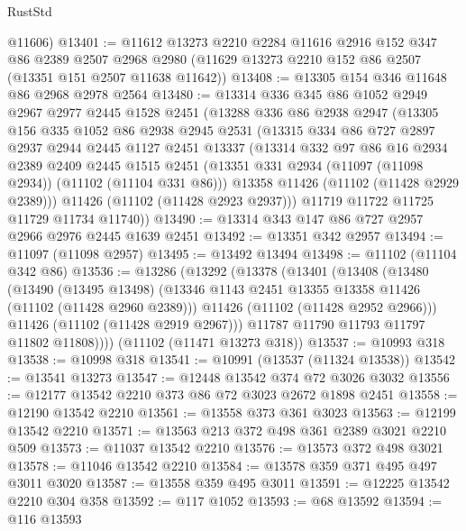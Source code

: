 \begin{lexlean}{RustStd}
\begin{coremodule}
      @11606)
@13401 := @11612
    @13273
    @2210
    @2284
    @11616
    @2916
    @152
    @347
    @86
    @2389
    @2507
    @2968
    @2980
    (@11629 @13273 @2210 @152 @86 @2507 (@13351 @151 @2507 @11638 @11642))
@13408 := @13305 @154 @346 @11648 @86 @2968 @2978 @2564
@13480 := @13314
    @336
    @345
    @86
    @1052
    @2949
    @2967
    @2977
    @2445
    @1528
    @2451
    (@13288
      @336
      @86
      @2938
      @2947
      (@13305
        @156
        @335
        @1052
        @86
        @2938
        @2945
        @2531
        (@13315
          @334
          @86
          @727
          @2897
          @2937
          @2944
          @2445
          @1127
          @2451
          @13337
          (@13314
            @332
            @97
            @86
            @16
            @2934
            @2389
            @2409
            @2445
            @1515
            @2451
            (@13351 @331 @2934 (@11097 (@11098 @2934)) (@11102 (@11104 @331 @86)))
            @13358
            @11426
            (@11102 (@11428 @2929 @2389)))
          @11426
          (@11102 (@11428 @2923 @2937)))
        @11719
        @11722
        @11725
        @11729
        @11734
        @11740))
@13490 := @13314 @343 @147 @86 @727 @2957 @2966 @2976 @2445 @1639 @2451
@13492 := @13351 @342 @2957
@13494 := @11097 (@11098 @2957)
@13495 := @13492 @13494
@13498 := @11102 (@11104 @342 @86)
@13536 := @13286
    (@13292
      (@13378
        (@13401
          (@13408
            (@13480
              (@13490
                (@13495 @13498)
                (@13346 @1143 @2451 @13355 @13358 @11426 (@11102 (@11428 @2960 @2389)))
                @11426
                (@11102 (@11428 @2952 @2966)))
              @11426
              (@11102 (@11428 @2919 @2967)))
            @11787
            @11790
            @11793
            @11797
            @11802
            @11808))))
    (@11102 (@11471 @13273 @318))
@13537 := @10993 @318
@13538 := @10998 @318
@13541 := @10991 (@13537 (@11324 @13538))
@13542 := @13541 @13273
@13547 := @12448 @13542 @374 @72 @3026 @3032
@13556 := @12177 @13542 @2210 @373 @86 @72 @3023 @2672 @1898 @2451
@13558 := @12190 @13542 @2210
@13561 := @13558 @373 @361 @3023
@13563 := @12199 @13542 @2210
@13571 := @13563 @213 @372 @498 @361 @2389 @3021 @2210 @509
@13573 := @11037 @13542 @2210
@13576 := @13573 @372 @498 @3021
@13578 := @11046 @13542 @2210
@13584 := @13578 @359 @371 @495 @497 @3011 @3020
@13587 := @13558 @359 @495 @3011
@13591 := @12225 @13542 @2210 @304 @358
@13592 := @117 @1052
@13593 := @68 @13592
@13594 := @116 @13593

\end{coremodule}
\end{lexlean}
